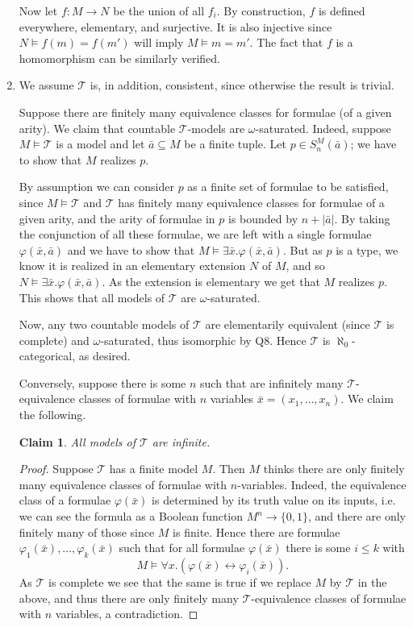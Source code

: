 \documentclass{article}
\theoremstyle{theorem}
\newtheorem{claim}{Claim}
\begin{document}
\begin{enumerate}[leftmargin=*]
		Now let $f\colon M \to N$ be the union of all $f_i$. By construction, $f$ is defined everywhere, elementary, and surjective. It is also injective since $N\models f(m) = f(m')$ will imply $M\models m = m'$. The fact that $f$ is a homomorphism can be similarly verified.
		
		\item We assume $\mathcal{T}$ is, in addition, consistent, since otherwise the result is trivial.
		
		Suppose there are finitely many equivalence classes for formulae (of a given arity). We claim that countable $\mathcal{T}$-models are $\omega$-saturated. Indeed, suppose $M\models\mathcal{T}$ is a model and let $\bar{a}\subseteq M$ be a finite tuple. Let $p\in S_n^M(\bar{a})$; we have to show that $M$ realizes $p$. 
		
		By assumption we can consider $p$ as a finite set of formulae to be satisfied, since $M\models \mathcal{T}$ and $\mathcal{T}$ has finitely many equivalence classes for formulae of a given arity, and the arity of formulae in $p$ is bounded by $n + |\bar{a}|$. By taking the conjunction of all these formulae, we are left with a single formulae $\varphi(\bar{x}, \bar{a})$ and we have to show that $M \models \exists \bar{x}. \varphi(\bar{x}, \bar{a})$. But as $p$ is a type, we know it is realized in an elementary extension $N$ of $M$, and so $N \models\exists \bar{x}. \varphi(\bar{x}, \bar{a})$. As the extension is elementary we get that $M$ realizes $p$. This shows that all models of $\mathcal{T}$ are $\omega$-saturated.
		
		Now, any two countable models of $\mathcal{T}$ are elementarily equivalent (since $\mathcal{T}$ is complete) and $\omega$-saturated, thus isomorphic by Q8. Hence $\mathcal{T}$ is $\aleph_0$-categorical, as desired.
		
		Conversely, suppose there is some $n$ such that are infinitely many $\mathcal{T}$-equivalence classes of formulae with $n$ variables $\bar{x} = (x_1,\ldots,x_n)$. We claim the following.
		\begin{claim}
			All models of $\mathcal{T}$ are infinite.
		\end{claim}
		\begin{proof}
			Suppose $\mathcal{T}$ has a finite model $M$. Then $M$ thinks there are only finitely many equivalence classes of formulae with $n$-variables. Indeed, the equivalence class of a formulae $\varphi(\bar{x})$ is determined by its truth value on its inputs, i.e. we can see the formula as a Boolean function $M^n \to \{0,1\}$, and there are only finitely many of those since $M$ is finite. Hence there are formulae $\varphi_1(\bar{x}),\ldots, \varphi_k(\bar{x})$ such that
			for all formulae $\varphi(\bar{x})$ there is some $i\leq k$ with
			\[
				M \models \forall x. (\varphi(\bar{x}) \leftrightarrow \varphi_i(\bar{x})).
			\]
			As $\mathcal{T}$ is complete we see that the same is true if we replace $M$ by $\mathcal{T}$ in the above, and thus there are only finitely many $\mathcal{T}$-equivalence classes of formulae with $n$ variables, a contradiction.
		\end{proof}
		

\end{enumerate}
\end{document}
